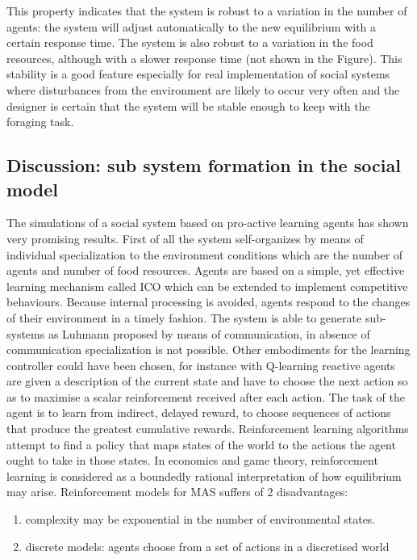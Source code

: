 This property indicates that the system is robust to a variation in the number
of agents: the system will adjust automatically to the new equilibrium with a certain
response time.
The system is also robust to a variation in the food resources, although with 
a slower response time (not shown in the Figure).
This stability is a good feature especially for real implementation of 
social systems where disturbances from the environment are likely to occur
very often and the designer is certain that the system will be stable enough
to keep with the foraging task.


\subsection{Discussion: sub system formation in the social model}
The simulations of a social system based on pro-active learning agents has shown
very promising results.
First of all the system self-organizes by means of individual specialization 
to the environment conditions which are the number of agents and number of food resources.
Agents are based on a simple, yet effective learning mechanism called ICO which
can be extended to implement competitive behaviours.
Because internal processing is avoided, agents respond to the changes of their
environment in a timely fashion.
The system is able to generate sub-systems as Luhmann proposed by means of communication,
in absence of communication specialization is not possible.
Other embodiments for the learning controller could have been chosen, for instance
with Q-learning \citep{watkins92a} reactive agents are given a description of the
current state and have to choose the next action so as to maximise a scalar
reinforcement received after each action.
The task of the agent is to learn from indirect, delayed reward, to choose sequences of actions
that produce the greatest cumulative rewards. Reinforcement learning algorithms attempt to find
a policy that maps states of the world to the actions the agent ought to take in those states.
In economics and game theory, reinforcement learning is considered as a boundedly rational
interpretation of how equilibrium may arise. Reinforcement models for MAS suffers of 2 disadvantages:
\begin{enumerate}
\item complexity may be exponential in the number of environmental states.
\item discrete models: agents choose from a set of actions in a discretised world
\end{enumerate}
